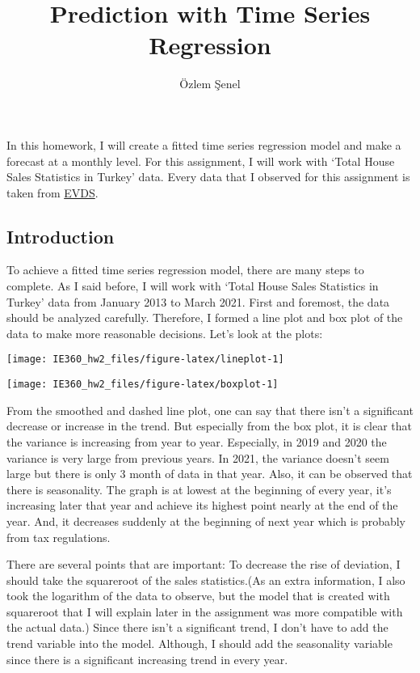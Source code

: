 \documentclass[
]{article}
\title{Prediction with Time Series Regression}
\author{Özlem Şenel}
\date{}
\begin{document}
\maketitle

In this homework, I will create a fitted time series regression model
and make a forecast at a monthly level. For this assignment, I will work
with `Total House Sales Statistics in Turkey' data. Every data that I
observed for this assignment is taken from
\href{https://evds2.tcmb.gov.tr/index.php}{EVDS}.

\hypertarget{introduction}{%
\subsection{Introduction}\label{introduction}}

To achieve a fitted time series regression model, there are many steps
to complete. As I said before, I will work with `Total House Sales
Statistics in Turkey' data from January 2013 to March 2021. First and
foremost, the data should be analyzed carefully. Therefore, I formed a
line plot and box plot of the data to make more reasonable decisions.
Let's look at the plots:

\begin{center}\texttt{[image: IE360\_hw2\_files/figure-latex/lineplot-1]} \end{center}

\begin{center}\texttt{[image: IE360\_hw2\_files/figure-latex/boxplot-1]} \end{center}

From the smoothed and dashed line plot, one can say that there isn't a
significant decrease or increase in the trend. But especially from the
box plot, it is clear that the variance is increasing from year to year.
Especially, in 2019 and 2020 the variance is very large from previous
years. In 2021, the variance doesn't seem large but there is only 3
month of data in that year. Also, it can be observed that there is
seasonality. The graph is at lowest at the beginning of every year, it's
increasing later that year and achieve its highest point nearly at the
end of the year. And, it decreases suddenly at the beginning of next
year which is probably from tax regulations.

There are several points that are important: To decrease the rise of
deviation, I should take the squareroot of the sales statistics.(As an
extra information, I also took the logarithm of the data to observe, but
the model that is created with squareroot that I will explain later in
the assignment was more compatible with the actual data.) Since there
isn't a significant trend, I don't have to add the trend variable into
the model. Although, I should add the seasonality variable since there
is a significant increasing trend in every year.
\end{document}
